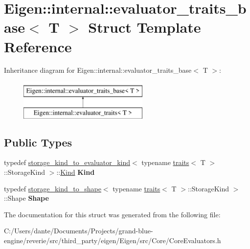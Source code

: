 \hypertarget{struct_eigen_1_1internal_1_1evaluator__traits__base}{}\section{Eigen\+::internal\+::evaluator\+\_\+traits\+\_\+base$<$ T $>$ Struct Template Reference}
\label{struct_eigen_1_1internal_1_1evaluator__traits__base}
Inheritance diagram for Eigen\+::internal\+::evaluator\+\_\+traits\+\_\+base$<$ T $>$\+:\begin{figure}[H]
\begin{center}
\leavevmode
\includegraphics[height=2.000000cm]{struct_eigen_1_1internal_1_1evaluator__traits__base}
\end{center}
\end{figure}
\subsection*{Public Types}
\begin{DoxyCompactItemize}
\item 
\mbox{\label{struct_eigen_1_1internal_1_1evaluator__traits__base_aa0f8c3c1e421a4806aa19a76bc4574c7}} 
typedef \mbox{\hyperlink{struct_eigen_1_1internal_1_1storage__kind__to__evaluator__kind}{storage\+\_\+kind\+\_\+to\+\_\+evaluator\+\_\+kind}}$<$ typename \mbox{\hyperlink{struct_eigen_1_1internal_1_1traits}{traits}}$<$ T $>$\+::Storage\+Kind $>$\+::\mbox{\hyperlink{struct_eigen_1_1internal_1_1_index_based}{Kind}} {\bfseries Kind}
\item 
\mbox{\label{struct_eigen_1_1internal_1_1evaluator__traits__base_aa972f428fa0642aadd6c9c8c3cf29994}} 
typedef \mbox{\hyperlink{struct_eigen_1_1internal_1_1storage__kind__to__shape}{storage\+\_\+kind\+\_\+to\+\_\+shape}}$<$ typename \mbox{\hyperlink{struct_eigen_1_1internal_1_1traits}{traits}}$<$ T $>$\+::Storage\+Kind $>$\+::Shape {\bfseries Shape}
\end{DoxyCompactItemize}


The documentation for this struct was generated from the following file\+:\begin{DoxyCompactItemize}
\item 
C\+:/\+Users/dante/\+Documents/\+Projects/grand-\/blue-\/engine/reverie/src/third\+\_\+party/eigen/\+Eigen/src/\+Core/Core\+Evaluators.\+h\end{DoxyCompactItemize}
